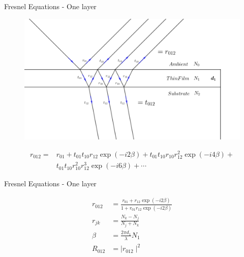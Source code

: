 \documentclass[10pt]{beamer}
\begin{document}
\begin{frame}{Fresnel Equations - One layer}
	
	\begin{figure} 
		 \begin{center}
		   \includegraphics[width=\textwidth]{figrefl.png}
		 \end{center}
	\end{figure}
	\begin{align*}
	r_{012} = &r_{01} + t_{01}t_{10}r_{12}\exp(-i2\beta) + t_{01}t_{10}r_{10}r_{12}^2\exp(-i4\beta)+ \\ &t_{01}t_{10}r_{10}^2r_{12}^3\exp(-i6\beta)+ \cdots
	\end{align*} 
	
\end{frame}
	
\begin{frame}{Fresnel Equations - One layer}
	
	\begin{align*}
	r_{012} &= \frac{r_{01}+r_{12}\exp(-i2\beta)}{1+r_{01}r_{12}\exp(-i2\beta)}\\
	r_{jk} &= \frac{N_k-N_j}{N_j+N_k}\\
	\beta &=\frac{2\pi d_1}{\lambda} N_1\\
	R_{012} &= \mid r_{012} \mid ^2 
	\end{align*}	
	
\end{frame}
\end{document}
